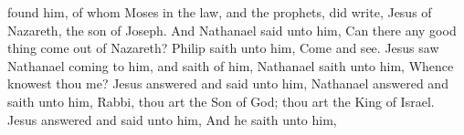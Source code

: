{found him, of
whom
Moses
in the
law,
and the
prophets, did
write,
Jesus
of
Nazareth, the
son of
Joseph.
And
Nathanael
said unto
him, Can
there
any
good
thing
come out
of
Nazareth?
Philip
saith unto
him,
Come
and
see.
Jesus
saw
Nathanael
coming
to
him,
and
saith
of
him,
{}
Nathanael
saith unto
him,
Whence knowest
thou
me?
Jesus
answered
and
said unto
him,
{}
Nathanael
answered
and
saith unto
him,
Rabbi,
thou
art the
Son of
God;
thou
art the
King of
Israel.
Jesus
answered
and
said unto
him,
{}
And he
saith unto
him,
{}

}

